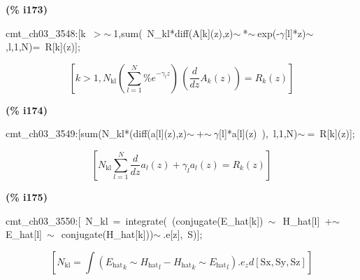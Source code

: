 \documentclass[fleqn]{article}
\begin{document}
\noindent
\begin{minipage}[t]{4.000000em}\color{red}\bfseries
(\% i173)	
\end{minipage}
\begin{minipage}[t]{\textwidth}\color{blue}
cmt\_ch03\_3548:[k\ \ensuremath{>}\ensuremath{\sim\ }1,sum(\ N\_kl*diff(A[k](z),z)\ensuremath{\sim\ }*\ensuremath{\sim\ }exp(-\ensuremath{\gamma}[l]*z)\ensuremath{\sim\ },l,1,N)=\ R[k](z)];
\end{minipage}
\[\displaystyle \tag{cmt\_ ch03\_ 3548} 
\left[ k\operatorname{>  }1\operatorname{,}{N_{\ensuremath{\mathrm{kl}}}} \left( \sum_{l=1}^{N}{\left. {{\% e}^{-{{\gamma }_l} z}}\right.}\right) \, \left( \frac{d}{d z} {A_k}(z)\right) ={R_k}(z)\right] \mbox{}
\]


\noindent
\begin{minipage}[t]{4.000000em}\color{red}\bfseries
(\% i174)	
\end{minipage}
\begin{minipage}[t]{\textwidth}\color{blue}
cmt\_ch03\_3549:[sum(N\_kl*(diff(a[l](z),z)\ensuremath{\sim\ }+\ensuremath{\sim\ }\ensuremath{\gamma}[l]*a[l](z)\ ),\ l,1,N)\ensuremath{\sim\ }=\ R[k](z)];
\end{minipage}
\[\displaystyle \tag{cmt\_ ch03\_ 3549} 
\left[ {N_{\ensuremath{\mathrm{kl}}}} \sum_{l=1}^{N}{\left. \frac{d}{d z} {a_l}(z)+{{\gamma }_l} {a_l}(z)\right.}={R_k}(z)\right] \mbox{}
\]


\noindent
\begin{minipage}[t]{4.000000em}\color{red}\bfseries
(\% i175)	
\end{minipage}
\begin{minipage}[t]{\textwidth}\color{blue}
cmt\_ch03\_3550:[\ N\_kl\ =\ integrate(\ (conjugate(E\_hat[k])\ \ensuremath{\sim\ }\ H\_hat[l]\ +\ensuremath{\sim\ }E\_hat[l]\ \ensuremath{\sim\ }\ conjugate(H\_hat[k]))\ensuremath{\sim\ }.e[z],\ S)];
\end{minipage}
\[\displaystyle \tag{cmt\_ ch03\_ 3550} 
\left[ {N_{\ensuremath{\mathrm{kl}}}}=\int {\left. \left( {{{E_{\ensuremath{\mathrm{hat}}}}}_k}\operatorname{\sim  }{{{H_{\ensuremath{\mathrm{hat}}}}}_l}-{{{H_{\ensuremath{\mathrm{hat}}}}}_k}\operatorname{\sim  }{{{E_{\ensuremath{\mathrm{hat}}}}}_l}\right) \ensuremath{\mathrm{ . }}{e_z}d\left[ \ensuremath{\mathrm{Sx}}\operatorname{,}\ensuremath{\mathrm{Sy}}\operatorname{,}\ensuremath{\mathrm{Sz}}\right] \right.}\right] \mbox{}
\]
\end{document}
